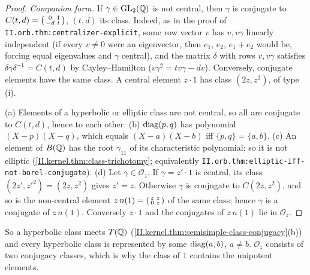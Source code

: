 \begin{theorem}
\end{theorem}
\begin{proof}
\emph{Companion form.} If $\gamma\in\mathrm{GL}_2(\mathbb{Q})$ is not central, then $\gamma$ is conjugate to $C(t,d)=\begin{psmallmatrix}0&1\\-d&t\end{psmallmatrix}$, $(t,d)$ its class. Indeed, as
in the proof of \texttt{II.orb.thm:centralizer-explicit}, some row vector $v$ has $v,v\gamma$ linearly independent (if every $v\neq0$ were an eigenvector, then $e_1$,
$e_2$, $e_1+e_2$ would be, forcing equal eigenvalues and $\gamma$ central), and the matrix $\delta$ with rows $v,v\gamma$ satisfies $\delta\gamma\delta^{-1}=C(t,d)$ by
Cayley--Hamilton ($v\gamma^2=tv\gamma-dv$). Conversely, conjugate elements have the same class. A central element $z\cdot1$ has class $(2z,z^2)$, of type (i).

(a) Elements of a hyperbolic or elliptic class are not central, so all are conjugate to $C(t,d)$, hence to each other. (b) $\operatorname{diag}(p,q)$ has polynomial
$(X-p)(X-q)$, which equals $(X-a)(X-b)$ iff $\{p,q\}=\{a,b\}$. (c) An element of $B(\mathbb{Q})$ has the root $\gamma_{11}$ of its characteristic polynomial; so it is not
elliptic (\cref{II.kernel.thm:class-trichotomy}; equivalently \texttt{II.orb.thm:elliptic-iff-not-borel-conjugate}). (d) Let $\gamma\in\mathcal O_z$. If $\gamma=z'\cdot1$ is
central, its class $(2z',z'^2)=(2z,z^2)$ gives $z'=z$. Otherwise $\gamma$ is conjugate to $C(2z,z^2)$, and so is the non-central element
$z\,n(1)=\begin{psmallmatrix}z&z\\0&z\end{psmallmatrix}$ of the same class; hence $\gamma$ is a conjugate of $z\,n(1)$. Conversely $z\cdot1$ and the conjugates of $z\,n(1)$ lie in
$\mathcal O_z$.
\end{proof}
\noindent So a hyperbolic class meets $T(\mathbb{Q})$ (\cref{II.kernel.thm:semisimple-class-conjugacy}(b)) and every hyperbolic class is represented by some $\operatorname{diag}(a,b)$,
$a\neq b$. $\mathcal O_z$ consists of two conjugacy classes, which is
why the class of $1$ contains the unipotent elements.


